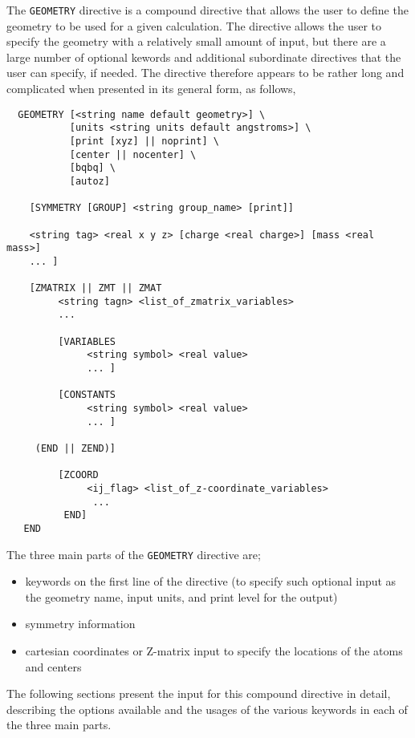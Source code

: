 \label{sec:geom}

The \verb+GEOMETRY+ directive is a compound directive that allows the
user to define the geometry to be used for a given calculation.  The
directive allows the user to specify the geometry with a relatively
small amount of input, but there are a large number of optional
kewords and additional subordinate directives that the user can
specify, if needed.  The directive therefore appears to be rather long
and complicated when presented in its general form, as follows,
\begin{verbatim}
  GEOMETRY [<string name default geometry>] \
           [units <string units default angstroms>] \
           [print [xyz] || noprint] \
           [center || nocenter] \
           [bqbq] \
           [autoz]
    
    [SYMMETRY [GROUP] <string group_name> [print]]

    <string tag> <real x y z> [charge <real charge>] [mass <real mass>]
    ... ]

    [ZMATRIX || ZMT || ZMAT
         <string tagn> <list_of_zmatrix_variables>
         ... 

         [VARIABLES
              <string symbol> <real value>
              ... ]
 
         [CONSTANTS
              <string symbol> <real value>
              ... ]

     (END || ZEND)]

         [ZCOORD
              <ij_flag> <list_of_z-coordinate_variables>
               ...
          END]
   END
\end{verbatim}

The three main parts of the \verb+GEOMETRY+ directive
are;

\begin{itemize}
\item keywords on the first line of the directive (to specify such optional
input as the geometry name, input units, and print level for the output)
\item symmetry information
\item cartesian coordinates or Z-matrix input to specify the locations 
of the atoms and centers
\end{itemize}

The following sections present the input for this compound directive in
detail, describing the options available and the usages of the various
keywords in each of the three main parts.


